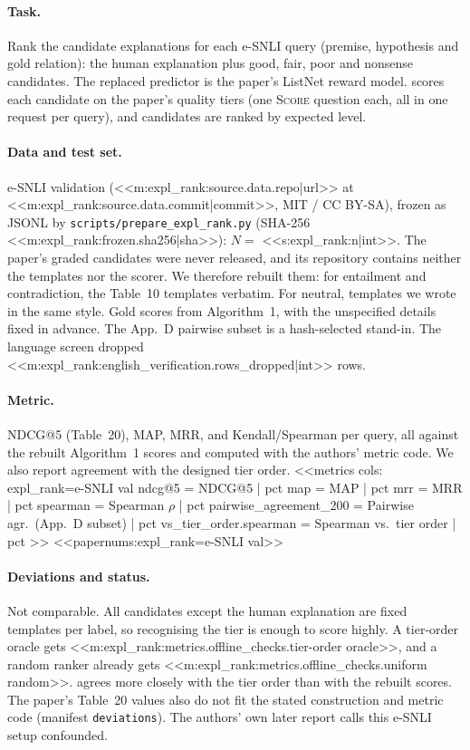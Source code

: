 \paragraph{Task.} Rank the candidate explanations for each e-SNLI query (premise, hypothesis and gold relation):
the human explanation plus good, fair, poor and nonsense candidates. The replaced predictor is the paper's
ListNet reward model. \jev{} scores each candidate on the paper's quality tiers (one \textsc{Score}
question each, all in one request per query), and candidates are ranked by expected level.

\paragraph{Data and test set.} e-SNLI validation (<<m:expl_rank:source.data.repo|url>> at
<<m:expl_rank:source.data.commit|commit>>, MIT / CC BY-SA), frozen as JSONL by \texttt{scripts/\allowbreak{}prepare\_expl\_rank.py} (SHA-256
<<m:expl_rank:frozen.sha256|sha>>): $N=$ <<s:expl_rank:n|int>>. The paper's graded candidates were never
released, and its repository contains neither the templates nor the scorer. We therefore rebuilt them: for
entailment and contradiction, the Table~10 templates verbatim. For neutral, templates we wrote in the same
style. Gold scores from Algorithm~1, with the unspecified details fixed in advance. The App.~D pairwise subset
is a hash-selected stand-in. The language screen dropped <<m:expl_rank:english_verification.rows_dropped|int>>
rows.

\paragraph{Metric.} NDCG@5 (Table~20), MAP, MRR, and Kendall/Spearman per query, all against the rebuilt
Algorithm~1 scores and computed with the authors' metric code. We also report agreement with the designed tier
order.
<<metrics
cols: expl_rank=e-SNLI val
ndcg@5 = NDCG@5 | pct
map = MAP | pct
mrr = MRR | pct
spearman = Spearman $\rho$ | pct
pairwise_agreement_200 = Pairwise agr.\ (App.~D subset) | pct
vs_tier_order.spearman = Spearman vs.\ tier order | pct
>>
<<papernums:expl_rank=e-SNLI val>>

\paragraph{Deviations and status.} Not comparable. All candidates except the human explanation are fixed
templates per label, so recognising the tier is enough to score highly. A tier-order oracle gets
<<m:expl_rank:metrics.offline_checks.tier-order oracle>>, and a random ranker already gets
<<m:expl_rank:metrics.offline_checks.uniform random>>. \jev{} agrees more closely with the tier order than with
the rebuilt scores. The paper's Table~20 values also do not fit the stated construction and metric code (manifest
\texttt{deviations}). The authors' own later report calls this e-SNLI setup
confounded.
